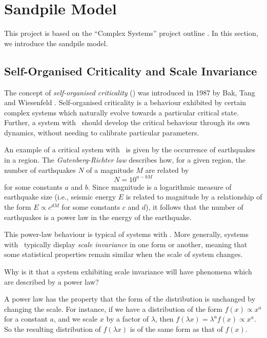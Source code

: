 \chapter{Sandpile Model}\label{ch:introduction}

This project is based on the ``Complex Systems'' project outline \cite{comsys}. In this section, we introduce the sandpile model.

\section{Self-Organised Criticality and Scale Invariance}

The concept of \emph{self-organised criticality} (\soc) was introduced in 1987 by Bak, Tang and Wiesenfeld \cite{BTW87,BTW88}. Self-organised criticality is a behaviour exhibited by certain complex systems which naturally evolve towards a particular critical state. Further, a system with \soc\ should develop the critical behaviour through its own dynamics, without needing to calibrate particular parameters.

An example of a critical system with \soc\ is given by the occurrence of earthquakes in a region. The \emph{Gutenberg-Richter law} \cite{GR44} describes how, for a given region, the number of earthquakes $N$ of a magnitude $M$ are related by \[N=10^{a-bM}\] for some constants $a$ and $b$. Since magnitude is a logarithmic measure of earthquake size (i.e., seismic energy $E$ is related to magnitude by a relationship of the form $E\propto c^{dM}$ for some constants $c$ and $d$), it follows that the number of earthquakes is a power law in the energy of the earthquake.

This power-law behaviour is typical of systems with \soc. More generally, systems with \soc\ typically display \emph{scale invariance} in one form or another, meaning that some statistical properties remain similar when the scale of system changes.

\begin{question}
    Why is it that a system exhibiting scale invariance will have phenomena which are described by a power law?
\end{question}

A power law has the property that the form of the distribution is unchanged by changing the scale. For instance, if we have a distribution of the form $f(x)\propto x^a$ for a constant $a$, and we scale $x$ by a factor of $\lambda$, then $f(\lambda x) = \lambda^a f(x) \propto x^a$. So the resulting distribution of $f(\lambda x)$ is of the same form as that of $f(x)$.





















